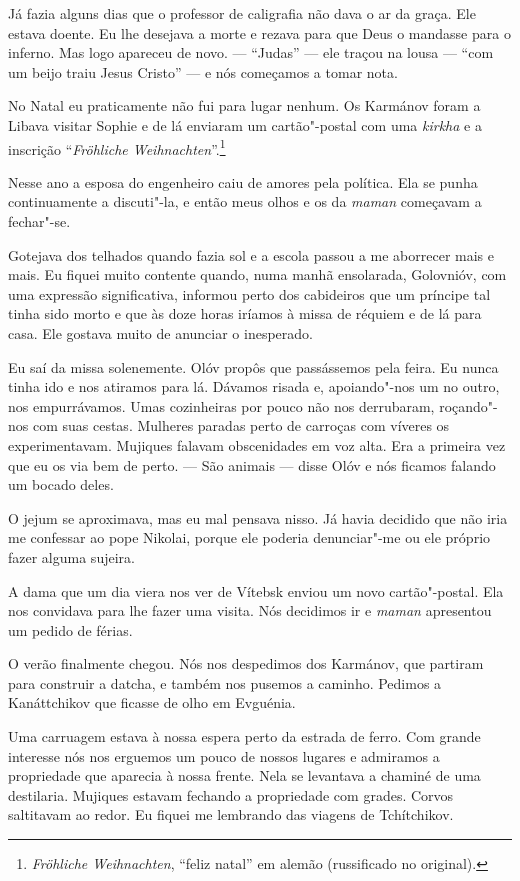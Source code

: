 Já fazia alguns dias que o professor de caligrafia não dava o ar da
graça. Ele estava doente. Eu lhe desejava a morte e rezava para que Deus
o mandasse para o inferno. Mas logo apareceu de novo. --- ``Judas'' ---
ele traçou na lousa --- ``com um beijo traiu Jesus Cristo'' --- e nós
começamos a tomar nota.

No Natal eu praticamente não fui para lugar nenhum. Os Karmánov foram a
Libava visitar Sophie e de lá enviaram um cartão"-postal com uma
\emph{kirkha} e a inscrição ``\emph{Fröhliche Weihnachten}''.\footnote{\emph{Fröhliche
  Weihnachten}, ``feliz natal'' em alemão (russificado no original).}

Nesse ano a esposa do engenheiro caiu de amores pela política. Ela se
punha continuamente a discuti"-la, e então meus olhos e os da
\emph{maman} começavam a fechar"-se.

Gotejava dos telhados quando fazia sol e a escola passou a me aborrecer
mais e mais. Eu fiquei muito contente quando, numa manhã ensolarada,
Golovnióv, com uma expressão significativa, informou perto dos
cabideiros que um príncipe tal tinha sido morto e que às doze horas
iríamos à missa de réquiem e de lá para casa. Ele gostava muito de
anunciar o inesperado.

Eu saí da missa solenemente. Olóv propôs que passássemos pela feira. Eu
nunca tinha ido e nos atiramos para lá. Dávamos risada e, apoiando"-nos
um no outro, nos empurrávamos. Umas cozinheiras por pouco não nos
derrubaram, roçando"-nos com suas cestas. Mulheres paradas perto de
carroças com víveres os experimentavam. Mujiques falavam
obscenidades em voz alta. Era a primeira vez que eu os via bem de perto.
--- São animais --- disse Olóv e nós ficamos falando um bocado deles.

O jejum se aproximava, mas eu mal pensava nisso. Já havia decidido que
não iria me confessar ao pope Nikolai, porque ele poderia denunciar"-me
ou ele próprio fazer alguma sujeira.

A dama que um dia viera nos ver de Vítebsk enviou um novo cartão"-postal.
Ela nos convidava para lhe fazer uma visita. Nós decidimos ir e
\emph{maman} apresentou um pedido de férias.

O verão finalmente chegou. Nós nos despedimos dos Karmánov, que partiram
para construir a datcha, e também nos pusemos a caminho. Pedimos a
Kanáttchikov que ficasse de olho em Evguénia.

Uma carruagem estava à nossa espera perto da estrada de ferro. Com
grande interesse nós nos erguemos um pouco de nossos lugares e admiramos
a propriedade que aparecia à nossa frente. Nela se levantava a chaminé
de uma destilaria. Mujiques estavam fechando a propriedade com grades.
Corvos saltitavam ao redor. Eu fiquei me lembrando das viagens de
Tchítchikov.

